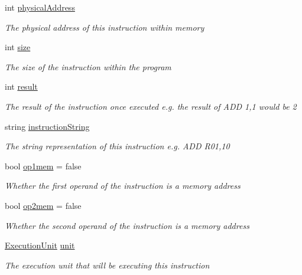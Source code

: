 \begin{DoxyCompactItemize}
int \hyperlink{class_c_p_u___o_s___simulator_1_1_c_p_u_1_1_instruction_a401c8f3740b63632e17db6f80b505a17}{physical\+Address}
\begin{DoxyCompactList}\small\item\em The physical address of this instruction within memory \end{DoxyCompactList}\item 
int \hyperlink{class_c_p_u___o_s___simulator_1_1_c_p_u_1_1_instruction_a8c533b0c08d8ac0a85b0e342f95cfeec}{size}
\begin{DoxyCompactList}\small\item\em The size of the instruction within the program \end{DoxyCompactList}\item 
int \hyperlink{class_c_p_u___o_s___simulator_1_1_c_p_u_1_1_instruction_a80637c7fae4090f9c73f468dbd6af7ee}{result}
\begin{DoxyCompactList}\small\item\em The result of the instruction once executed e.\+g. the result of A\+D\+D 1,1 would be 2 \end{DoxyCompactList}\item 
string \hyperlink{class_c_p_u___o_s___simulator_1_1_c_p_u_1_1_instruction_ab58373ca153de047b36c1036e07db7a8}{instruction\+String}
\begin{DoxyCompactList}\small\item\em The string representation of this instruction e.\+g. A\+D\+D R01,10 \end{DoxyCompactList}\item 
bool \hyperlink{class_c_p_u___o_s___simulator_1_1_c_p_u_1_1_instruction_ad39c82c478ef1de45aae7cf7cf38575b}{op1mem} = false
\begin{DoxyCompactList}\small\item\em Whether the first operand of the instruction is a memory address \end{DoxyCompactList}\item 
bool \hyperlink{class_c_p_u___o_s___simulator_1_1_c_p_u_1_1_instruction_ac414328ee54248a148c485a08a7eff44}{op2mem} = false
\begin{DoxyCompactList}\small\item\em Whether the second operand of the instruction is a memory address \end{DoxyCompactList}\item 
\hyperlink{class_c_p_u___o_s___simulator_1_1_c_p_u_1_1_execution_unit}{Execution\+Unit} \hyperlink{class_c_p_u___o_s___simulator_1_1_c_p_u_1_1_instruction_a0337c93fbfb5993eab37f1d052ca5f43}{unit}
\begin{DoxyCompactList}\small\item\em The execution unit that will be executing this instruction \end{DoxyCompactList}\end{DoxyCompactItemize}



